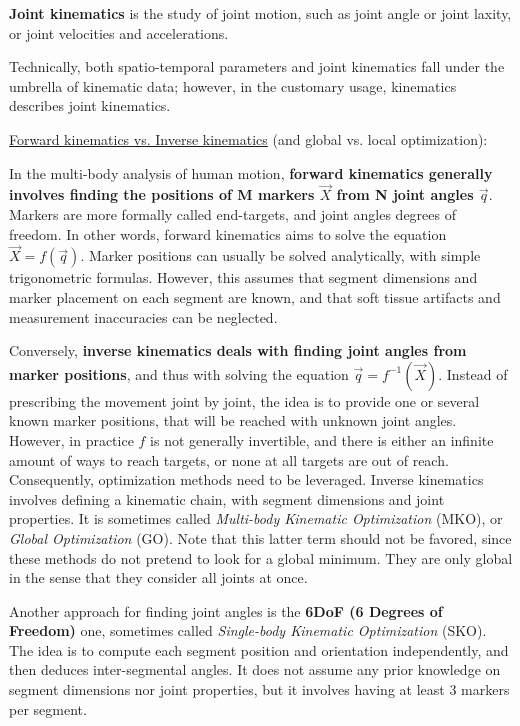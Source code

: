 \textbf{Joint kinematics} is the study of joint motion, such as joint angle or joint laxity, or joint velocities and accelerations.

Technically, both spatio-temporal parameters and joint kinematics fall under the umbrella of kinematic data; however, in the customary usage, kinematics describes joint kinematics.


\vspace*{0.5cm}
\noindent\underline{Forward kinematics vs. Inverse kinematics} (and global vs. local optimization):

In the multi-body analysis of human motion, \textbf{forward kinematics generally involves finding the positions of M markers $\overrightarrow{X}$ from N joint angles $\overrightarrow{q}$}. Markers are more formally called end-targets, and joint angles degrees of freedom. In other words, forward kinematics aims to solve the equation $\overrightarrow{X}=f(\overrightarrow{q})$. Marker positions can usually be solved analytically, with simple trigonometric formulas. However, this assumes that segment dimensions and marker placement on each segment are known, and that soft tissue artifacts and measurement inaccuracies can be neglected.

Conversely, \textbf{inverse kinematics deals with finding joint angles from marker positions}, and thus with solving the equation $\overrightarrow{q}=f^{-1}(\overrightarrow{X})$. Instead of prescribing the movement joint by joint, the idea is to provide one or several known marker positions, that will be reached with unknown joint angles. However, in practice $f$ is not generally invertible, and there is either an infinite amount of ways to reach targets, or none at all targets are out of reach. Consequently, optimization methods need to be leveraged. Inverse kinematics involves defining a kinematic chain, with segment dimensions and joint properties. It is sometimes called \emph{Multi-body Kinematic Optimization} (MKO), or \emph{Global Optimization} (GO). Note that this latter term should not be favored, since these methods do not pretend to look for a global minimum. They are only global in the sense that they consider all joints at once.

Another approach for finding joint angles is the \textbf{6DoF (6 Degrees of Freedom)} one, sometimes called \emph{Single-body Kinematic Optimization} (SKO). The idea is to compute each segment position and orientation independently, and then deduces inter-segmental angles. It does not assume any prior knowledge on segment dimensions nor joint properties, but it involves having at least 3 markers per segment.

